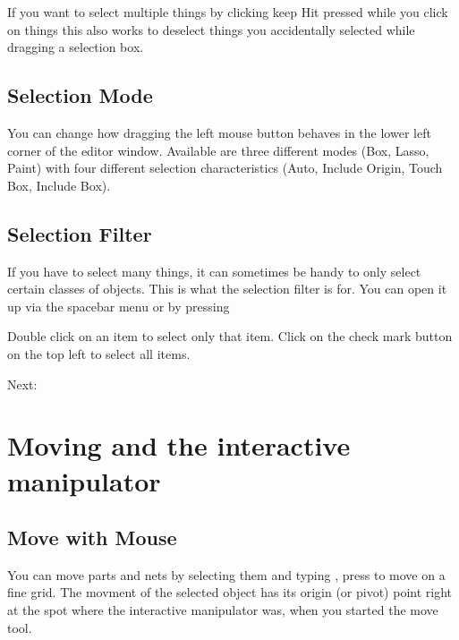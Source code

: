 \documentclass[letterpaper,10pt,czech]{sphinxmanual}
\begin{document}
If you want to select multiple things by clicking keep Hit  pressed while you click on things \textendash{} this also works to deselect things you accidentally selected while dragging a selection box.


\section{Selection Mode}
\label{\detokenize{selection:selection-mode}}
\noindent{}

You can change how dragging the left mouse button behaves in the lower left corner of the editor window. Available are three different modes (Box, Lasso, Paint) with four different selection characteristics (Auto, Include Origin, Touch Box, Include Box).


\section{Selection Filter}
\label{\detokenize{selection:selection-filter}}
\noindent{}

If you have to select many things, it can sometimes be handy to only select certain classes of objects. This is what the selection filter is for. You can open it up via the spacebar menu or by pressing 

Double click on an item to select only that item. Click on the check mark button on the top left to select all items.

Next: {\hyperref[\detokenize{move::doc}]{}}


\chapter{Moving and the interactive manipulator}
\label{\detokenize{move:moving-and-the-interactive-manipulator}}\label{\detokenize{move::doc}}

\section{Move with Mouse}
\label{\detokenize{move:move-with-mouse}}
You can move parts and nets by selecting them and typing , press  to move on a fine grid. The movment of the selected object has its origin (or pivot) point right at the spot where the interactive manipulator was, when you started the move tool.
\end{document}
